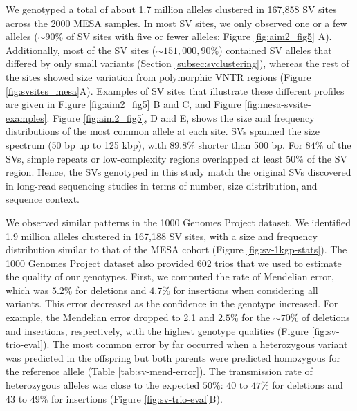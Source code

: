 \documentclass[11pt]{ucscthesis}
\begin{document}
We genotyped a total of about 1.7 million alleles clustered in 167,858 SV sites across the 2000 MESA samples.
In most SV sites, we only observed one or a few alleles ($\sim90\%$ of SV sites with five or fewer alleles; Figure \ref{fig:aim2_fig5} A).
Additionally, most of the SV sites ($\sim151,000, 90\%$) contained SV alleles that differed by only small variants (Section \ref{subsec:svclustering}), whereas the rest of the sites showed size variation from polymorphic VNTR regions (Figure \ref{fig:svsites_mesa}A).
Examples of SV sites that illustrate these different profiles are given in Figure \ref{fig:aim2_fig5} B and C, and Figure \ref{fig:mesa-svsite-examples}.
Figure \ref{fig:aim2_fig5}, D and E, shows the size and frequency distributions of the most common allele at each site.
SVs spanned the size spectrum (50 bp up to 125 kbp), with $89.8\%$ shorter than 500 bp.
For $84\%$ of the SVs, simple repeats or low-complexity regions overlapped at least $50\%$ of the SV region.
Hence, the SVs genotyped in this study match the original SVs discovered in long-read sequencing studies \cite{zook_robust_2020,chaisson_sv_2019,audano2019c} in terms of number, size distribution, and sequence context.

We observed similar patterns in the 1000 Genomes Project dataset.
We identified 1.9 million alleles clustered in 167,188 SV sites, with a size and frequency distribution similar to that of the MESA cohort (Figure \ref{fig:sv-1kgp-stats}).
The 1000 Genomes Project dataset also provided 602 trios that we used to estimate the quality of our genotypes.
First, we computed the rate of Mendelian error, which was $5.2\%$ for deletions and $4.7\%$ for insertions when considering all variants.
This error decreased as the confidence in the genotype increased. For example, the Mendelian error dropped to 2.1 and $2.5\%$ for the $\sim70\%$ of deletions and insertions, respectively, with the highest genotype qualities (Figure \ref{fig:sv-trio-eval}).
The most common error by far occurred when a heterozygous variant was predicted in the offspring but both parents were predicted homozygous for the reference allele (Table \ref{tab:sv-mend-error}).
The transmission rate of heterozygous alleles was close to the expected $50\%$: 40 to $47\%$ for deletions and 43 to $49\%$ for insertions (Figure \ref{fig:sv-trio-eval}B).
\end{document}
